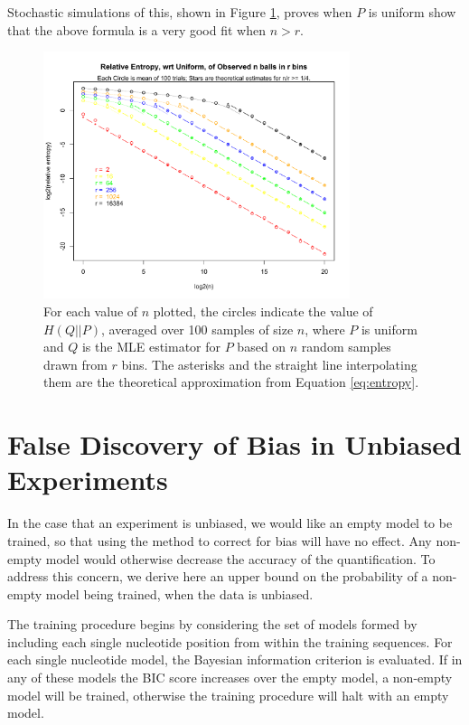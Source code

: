 \documentclass[letterpaper]{article}
\begin{document}
Stochastic simulations of this, shown in Figure \ref{fig:entropy}, proves when
$P$ is uniform show that the above formula is a very good fit when $n > r$.

\begin{figure}[H]
\centerline{\includegraphics[width=0.8\textwidth]{fig/entropy.pdf}}
\caption{For each value of $n$ plotted, the circles indicate the value of
$H(Q||P)$, averaged over 100 samples of size $n$, where $P$ is uniform and $Q$
is the MLE estimator for $P$ based on $n$ random samples drawn from $r$ bins.
The asterisks and the straight line interpolating them are the theoretical
approximation from Equation \ref{eq:entropy}.
}
\label{fig:entropy}
\end{figure}

\section{False Discovery of Bias in Unbiased Experiments}

In the case that an experiment is unbiased, we would like an empty model to be
trained, so that using the method to correct for bias will have no effect. Any
non-empty model would otherwise decrease the accuracy of the quantification. To
address this concern, we derive here an upper bound on the probability of a
non-empty model being trained, when the data is unbiased.

The training procedure begins by considering the set of models formed by
including each single nucleotide position from within the training sequences.
For each single nucleotide model, the Bayesian information criterion is
evaluated. If in any of these models the BIC score increases over the empty
model, a non-empty model will be trained, otherwise the training procedure will
halt with an empty model.
\end{document}

